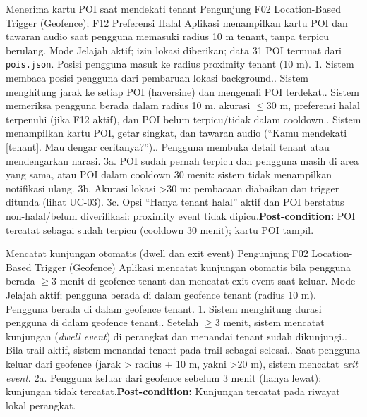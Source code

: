 {Menerima kartu POI saat mendekati tenant}
{Pengunjung}
{F02 Location-Based Trigger (Geofence); F12 Preferensi Halal}
{Aplikasi menampilkan kartu POI dan tawaran audio saat pengguna memasuki radius 10 m tenant, tanpa terpicu berulang.}
{Mode Jelajah aktif; izin lokasi diberikan; data 31 POI termuat dari \texttt{pois.json}.}
{Posisi pengguna masuk ke radius proximity tenant (10 m).}
{1. Sistem membaca posisi pengguna dari pembaruan lokasi background.. Sistem menghitung jarak ke setiap POI (haversine) dan mengenali POI terdekat.. Sistem memeriksa pengguna berada dalam radius 10 m, akurasi \(\le\)30 m, preferensi halal terpenuhi (jika F12 aktif), dan POI belum terpicu/tidak dalam cooldown.. Sistem menampilkan kartu POI, getar singkat, dan tawaran audio (``Kamu mendekati [tenant]. Mau dengar ceritanya?'').. Pengguna membuka detail tenant atau mendengarkan narasi.}
{3a. POI sudah pernah terpicu dan pengguna masih di area yang sama, atau POI dalam cooldown 30 menit: sistem tidak menampilkan notifikasi ulang.\newline
3b. Akurasi lokasi >30 m: pembacaan diabaikan dan trigger ditunda (lihat UC-03).\newline
3c. Opsi ``Hanya tenant halal'' aktif dan POI berstatus non-halal/belum diverifikasi: proximity event tidak dipicu.\newline\textbf{Post-condition:} POI tercatat sebagai sudah terpicu (cooldown 30 menit); kartu POI tampil.}

{Mencatat kunjungan otomatis (dwell dan exit event)}
{Pengunjung}
{F02 Location-Based Trigger (Geofence)}
{Aplikasi mencatat kunjungan otomatis bila pengguna berada \(\ge\)3 menit di geofence tenant dan mencatat exit event saat keluar.}
{Mode Jelajah aktif; pengguna berada di dalam geofence tenant (radius 10 m).}
{Pengguna berada di dalam geofence tenant.}
{1. Sistem menghitung durasi pengguna di dalam geofence tenant.. Setelah \(\ge\)3 menit, sistem mencatat kunjungan (\textit{dwell event}) di perangkat dan menandai tenant sudah dikunjungi.. Bila trail aktif, sistem menandai tenant pada trail sebagai selesai.. Saat pengguna keluar dari geofence (jarak > radius + 10 m, yakni >20 m), sistem mencatat \textit{exit event}.}
{2a. Pengguna keluar dari geofence sebelum 3 menit (hanya lewat): kunjungan tidak tercatat.\newline\textbf{Post-condition:} Kunjungan tercatat pada riwayat lokal perangkat.}

